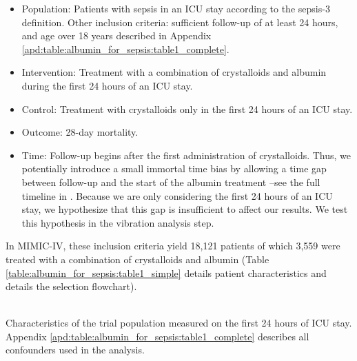 \documentclass[10pt,letterpaper]{article}
\begin{document}
\begin{itemize}[leftmargin=2ex]
    \item \textcolor{P}{Population}: Patients with sepsis in an ICU stay
          according to the sepsis-3 definition. Other inclusion criteria:
          sufficient follow-up of at least 24 hours, and age over 18 years
          described in Appendix \ref{apd:table:albumin_for_sepsis:table1_complete}.

    \item \textcolor{I}{Intervention}: Treatment with a combination of
          crystalloids and albumin during the first 24 hours of an ICU stay.

    \item \textcolor{C}{Control}: Treatment with crystalloids only in the first 24
          hours of an ICU stay.

    \item \textcolor{O}{Outcome}: 28-day mortality.

    \item \textcolor{T}{Time}: Follow-up begins after the first administration of
          crystalloids. Thus, we potentially introduce a small immortal time bias
          by allowing a time gap between follow-up and the start of the albumin
          treatment --see the full timeline in . Because
          we are only considering the first 24 hours of an ICU stay, we
          hypothesize that this gap is insufficient to affect our results. We test
          this hypothesis in the vibration analysis step.
\end{itemize}

In MIMIC-IV, these inclusion criteria yield 18,121 patients of which 3,559 were
treated with a combination of crystalloids and albumin
(Table \ref{table:albumin_for_sepsis:table1_simple} details
patient characteristics and  details the selection flowchart).


\begin{table}[h!]
    \centering\small
    \resizebox{\columnwidth}{!}{
    }
    \\[.5ex]

    \caption{Characteristics of the trial population measured on the first 24
        hours of ICU stay. Appendix \ref{apd:table:albumin_for_sepsis:table1_complete}
        describes all confounders used in the analysis.}\label{table:albumin_for_sepsis:table1_simple}
\end{table}
\end{document}
